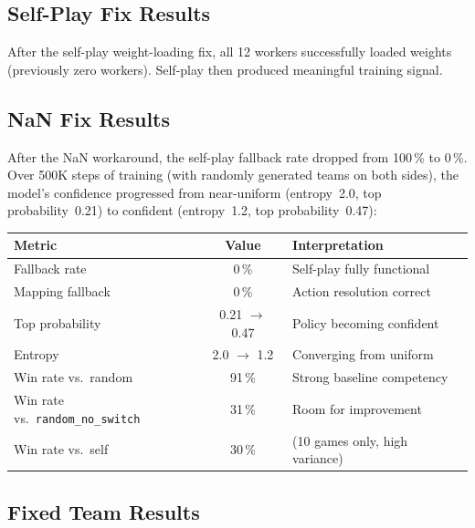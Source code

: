 \subsection{Self-Play Fix Results}

After the self-play weight-loading fix, all 12 workers successfully loaded
weights (previously zero workers).  Self-play then produced meaningful
training signal.

\subsection{NaN Fix Results}

After the NaN workaround, the self-play fallback rate dropped from 100\,\% to
0\,\%.  Over 500K steps of training (with randomly generated teams on both
sides), the model's confidence progressed from near-uniform (entropy~2.0,
top probability~0.21) to confident (entropy~1.2, top probability~0.47):

\begin{center}
\small
\begin{tabularx}{\textwidth}{l c l}
  \toprule
  \textbf{Metric} & \textbf{Value} & \textbf{Interpretation} \\
  \midrule
  Fallback rate       & 0\,\%         & Self-play fully functional \\
  Mapping fallback    & 0\,\%         & Action resolution correct \\
  Top probability     & 0.21 $\to$ 0.47 & Policy becoming confident \\
  Entropy             & 2.0 $\to$ 1.2  & Converging from uniform \\
  Win rate vs.\ random & 91\,\%      & Strong baseline competency \\
  Win rate vs.\ \texttt{random\_no\_switch} & 31\,\% & Room for improvement \\
  Win rate vs.\ self   & 30\,\%      & (10 games only, high variance) \\
  \bottomrule
\end{tabularx}
\end{center}


\subsection{Fixed Team Results}

